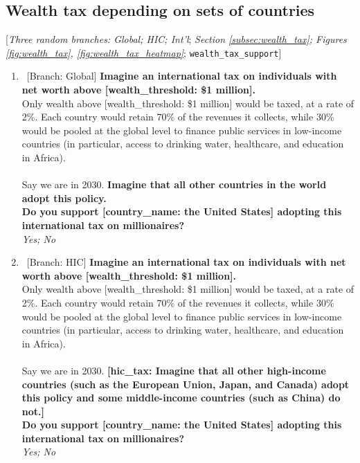  \subsection*{Wealth tax depending on sets of countries} 
 [\textit{Three random branches: Global; HIC; Int'l}; \textit{Section \ref{subsec:wealth_tax}; Figures \ref{fig:wealth_tax}, \ref{fig:wealth_tax_heatmap}}; 
 \verb|wealth_tax_support|] 
 \begin{enumerate}[resume] %
\item ~[Branch: Global] \label{q:global_tax_support} \textbf{Imagine an international tax on individuals with net worth above [wealth\_threshold: \$1 million].~}\\Only wealth above [wealth\_threshold: \$1 million] would be taxed, at a rate of 2\%. Each country would retain 70\% of the revenues it collects, while 30\% would be pooled at the global level to finance public services in low-income countries (in particular, access to drinking water, healthcare, and education in Africa). \\\\Say we are in 2030. \textbf{Imagine that all other countries in the world adopt this policy. \\Do you support [country\_name: the United States] adopting this international tax on millionaires?}
  \\ \textit{Yes; No}

\item ~[Branch: HIC] \label{q:hic_tax_support} \textbf{Imagine an international tax on individuals with net worth above [wealth\_threshold: \$1 million].~}\\Only wealth above [wealth\_threshold: \$1 million] would be taxed, at a rate of 2\%. Each country would retain 70\% of the revenues it collects, while 30\% would be pooled at the global level to finance public services in low-income countries (in particular, access to drinking water, healthcare, and education in Africa). \\\\Say we are in 2030. \textbf{[hic\_tax: Imagine that all other high-income countries (such as the European Union, Japan, and Canada) adopt this policy and some middle-income countries (such as China) do not.]}\textbf{~\\Do you support [country\_name: the United States] adopting this international tax on millionaires?}
  \\ \textit{Yes; No}


\end{enumerate}
